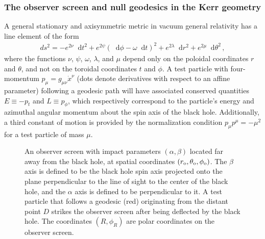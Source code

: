 \documentclass[graybox,envcountchap]{svmult}
\newcommand{\ed}{\mathop{}\!\mathrm{d}}
\newcommand{\pa}[1]{\left(#1\right)}
\begin{document}
\subsubsection*{The observer screen and null geodesics in the Kerr geometry}

A general stationary and axisymmetric metric in vacuum general relativity has a line element of the form
\begin{align}
    ds^2=-e^{2\nu}\ed t^2+e^{2\psi}\pa{\ed\phi-\omega\ed t}^2+e^{2\lambda}\ed r^2+e^{2\mu}\ed\theta^2\,,
\end{align}
where the functions $\nu$, $\psi$, $\omega$, $\lambda$, and $\mu$ depend only on the poloidal coordinates $r$ and $\theta$, and not on the toroidal coordinates $t$ and $\phi$.
A test particle with four-momentum $p_\mu=g_{\mu\nu}\dot{x}^\nu$ (dots denote derivatives with respect to an affine parameter) following a geodesic path will have associated conserved quantities $E\equiv-p_t$ and $L\equiv p_\phi$, which respectively correspond to the particle's energy and azimuthal angular momentum about the spin axis of the black hole.
Additionally, a third constant of motion is provided by the normalization condition $p_\mu p^\mu=-\mu^2$ for a test particle of mass $\mu$.

\begin{figure}[tb]
    \centering
    \caption[Geometry of an observer screen aligned with a black hole.]{An observer screen with impact parameters $(\alpha,\beta)$ located far away from the black hole, at spatial coordinates $(r_{\rm o},\theta_{\rm o},\phi_{\rm o})$.
    The $\beta$ axis is defined to be the black hole spin axis projected onto the plane perpendicular to the line of sight to the center of the black hole, and the $\alpha$ axis is defined to be perpendicular to it.
    A test particle that follows a geodesic (red) originating from the distant point $D$ strikes the observer screen after being deflected by the black hole.
    The coordinates $(R,\phi_R)$ are polar coordinates on the observer screen.}
    \label{fig:ObserverScreen}
\end{figure}
\end{document}
